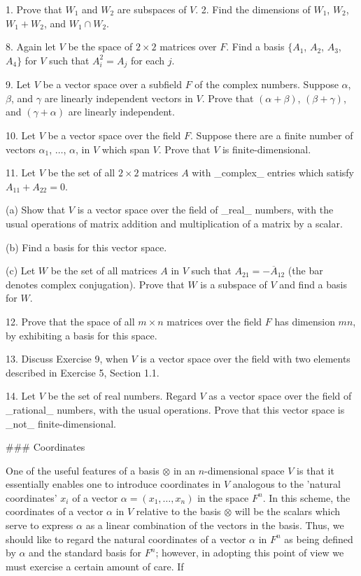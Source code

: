 1. Prove that \(W_{1}\) and \(W_{2}\) are subspaces of \(V\). 2. Find the dimensions of \(W_{1}\), \(W_{2}\), \(W_{1}+W_{2}\), and \(W_{1}\cap W_{2}\).

8. Again let \(V\) be the space of \(2\times 2\) matrices over \(F\). Find a basis \(\{A_{1}\), \(A_{2}\), \(A_{3}\), \(A_{4}\}\) for \(V\) such that \(A_{i}^{2}=A_{j}\) for each \(j\).

9. Let \(V\) be a vector space over a subfield \(F\) of the complex numbers. Suppose \(\alpha\), \(\beta\), and \(\gamma\) are linearly independent vectors in \(V\). Prove that \((\alpha+\beta)\), \((\beta+\gamma)\), and \((\gamma+\alpha)\) are linearly independent.

10. Let \(V\) be a vector space over the field \(F\). Suppose there are a finite number of vectors \(\alpha_{1}\), \(\ldots\), \(\alpha\), in \(V\) which span \(V\). Prove that \(V\) is finite-dimensional.

11. Let \(V\) be the set of all \(2\times 2\) matrices \(A\) with _complex_ entries which satisfy \(A_{11}+A_{22}=0\).

(a) Show that \(V\) is a vector space over the field of _real_ numbers, with the usual operations of matrix addition and multiplication of a matrix by a scalar.

(b) Find a basis for this vector space.

(c) Let \(W\) be the set of all matrices \(A\) in \(V\) such that \(A_{21}=-\overline{A}_{12}\) (the bar denotes complex conjugation). Prove that \(W\) is a subspace of \(V\) and find a basis for \(W\).

12. Prove that the space of all \(m\times n\) matrices over the field \(F\) has dimension \(mn\), by exhibiting a basis for this space.

13. Discuss Exercise 9, when \(V\) is a vector space over the field with two elements described in Exercise 5, Section 1.1.

14. Let \(V\) be the set of real numbers. Regard \(V\) as a vector space over the field of _rational_ numbers, with the usual operations. Prove that this vector space is _not_ finite-dimensional.

### Coordinates

One of the useful features of a basis \(\otimes\) in an \(n\)-dimensional space \(V\) is that it essentially enables one to introduce coordinates in \(V\) analogous to the 'natural coordinates' \(x_{i}\) of a vector \(\alpha=(x_{1},\ldots,x_{n})\) in the space \(F^{n}\). In this scheme, the coordinates of a vector \(\alpha\) in \(V\) relative to the basis \(\otimes\) will be the scalars which serve to express \(\alpha\) as a linear combination of the vectors in the basis. Thus, we should like to regard the natural coordinates of a vector \(\alpha\) in \(F^{n}\) as being defined by \(\alpha\) and the standard basis for \(F^{n}\); however, in adopting this point of view we must exercise a certain amount of care. If

